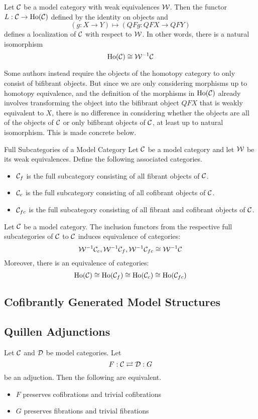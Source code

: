 \documentclass[a4paper]{article}
\begin{document}
\begin{thm}{}{} Let $\mathcal{C}$ be a model category with weak equivalences $\mathcal{W}$. Then the functor $L:\mathcal{C}\to\text{Ho}(\mathcal{C})$ defined by the identity on objects and $$(g:X\to Y)\mapsto(QFg:QFX\to QFY)$$ defines a localization of $\mathcal{C}$ with respect to $\mathcal{W}$. In other words, there is a natural isomorphism $$\text{Ho}(\mathcal{C})\cong\mathcal{W}^{-1}\mathcal{C}$$
\end{thm}

Some authors instead require the objects of the homotopy category to only consist of bifibrant objects. But since we are only considering morphisms up to homotopy equivalence, and the definition of the morphisms in $\text{Ho}(\mathcal{C})$ already involves transforming the object into the bifibrant object $QFX$ that is weakly equivalent to $X$, there is no difference in considering whether the objects are all of the objects of $\mathcal{C}$ or only bifibrant objects of $\mathcal{C}$, at least up to natural isomorphism. This is made concrete below. 

\begin{defn}{Full Subcategories of a Model Category}{} Let $\mathcal{C}$ be a model category and let $\mathcal{W}$ be its weak equivalences. Define the following associated categories. 
\begin{itemize}
\item $\mathcal{C}_f$ is the full subcategory consisting of all fibrant objects of $\mathcal{C}$. 
\item $\mathcal{C}_c$ is the full subcategory consisting of all cofibrant objects of $\mathcal{C}$. 
\item $\mathcal{C}_{fc}$ is the full subcategory consisting of all fibrant and cofibrant objects of $\mathcal{C}$. 
\end{itemize}
\end{defn}

\begin{thm}{}{} Let $\mathcal{C}$ be a model category. The inclusion functors from the respective full subcategories of $\mathcal{C}$ to $\mathcal{C}$ induces equivalence of categories: $$\mathcal{W}^{-1}\mathcal{C}_c,\mathcal{W}^{-1}\mathcal{C}_f,\mathcal{W}^{-1}\mathcal{C}_{fc}\cong\mathcal{W}^{-1}\mathcal{C}$$ Moreover, there is an equivalence of categories: $$\text{Ho}(\mathcal{C})\cong\text{Ho}(\mathcal{C}_f)\cong\text{Ho}(\mathcal{C}_c)\cong\text{Ho}(\mathcal{C}_{fc})$$
\end{thm}

\subsection{Cofibrantly Generated Model Structures}

\subsection{Quillen Adjunctions}
\begin{thm}{}{} Let $\mathcal{C}$ and $\mathcal{D}$ be model categories. Let $$F:\mathcal{C}\rightleftarrows\mathcal{D}:G$$ be an adjuction. Then the following are equivalent. 
\begin{itemize}
\item $F$ preserves cofibrations and trivial cofibrations
\item $G$ preserves fibrations and trivial fibrations
\end{itemize}
\end{thm}
\end{document}
